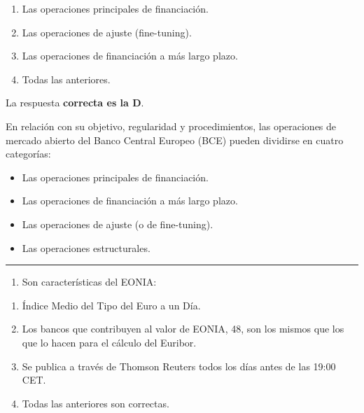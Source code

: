 \documentclass[
  letterpaper,
  DIV=11,
  numbers=noendperiod]{scrreprt}
\providecommand{\tightlist}{%
  \setlength{\itemsep}{0pt}\setlength{\parskip}{0pt}}\usepackage{longtable,booktabs,array}
\begin{document}
\begin{enumerate}
\def\labelenumi{\alph{enumi})}
\item
  Las operaciones principales de financiación.
\item
  Las operaciones de ajuste (fine-tuning).
\item
  Las operaciones de financiación a más largo plazo.
\item
  Todas las anteriores.
\end{enumerate}

\begin{tcolorbox}[enhanced jigsaw, left=2mm, opacityback=0, colback=white, breakable, arc=.35mm, bottomrule=.15mm, rightrule=.15mm, toprule=.15mm, leftrule=.75mm, colframe=quarto-callout-tip-color-frame]
\begin{minipage}[t]{5.5mm}
\textcolor{quarto-callout-tip-color}{\faLightbulb}
\end{minipage}%
\begin{minipage}[t]{\textwidth - 5.5mm}

La respuesta \textbf{correcta es la D}.

En relación con su objetivo, regularidad y procedimientos, las
operaciones de mercado abierto del Banco Central Europeo (BCE) pueden
dividirse en cuatro categorías:

\begin{itemize}
\item
  Las operaciones principales de financiación.
\item
  Las operaciones de financiación a más largo plazo.
\item
  Las operaciones de ajuste (o de fine-tuning).
\item
  Las operaciones estructurales.
\end{itemize}

\end{minipage}%
\end{tcolorbox}

\begin{center}\rule{0.5\linewidth}{0.5pt}\end{center}

\begin{enumerate}
\def\labelenumi{\arabic{enumi}.}
\setcounter{enumi}{9}
\tightlist
\item
  Son características del EONIA:
\end{enumerate}

\begin{enumerate}
\def\labelenumi{\alph{enumi})}
\item
  Índice Medio del Tipo del Euro a un Día.
\item
  Los bancos que contribuyen al valor de EONIA, 48, son los mismos que
  los que lo hacen para el cálculo del Euribor.
\item
  Se publica a través de Thomson Reuters todos los días antes de las
  19:00 CET.
\item
  Todas las anteriores son correctas.
\end{enumerate}
\end{document}
